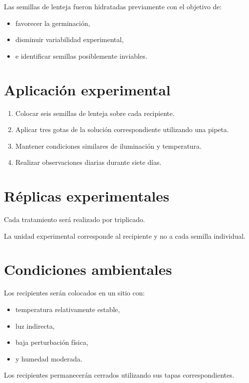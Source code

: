 Las semillas de lenteja fueron hidratadas previamente con el objetivo de:

\begin{itemize}
\item favorecer la germinación,
\item disminuir variabilidad experimental,
\item e identificar semillas posiblemente inviables.
\end{itemize}

\section{Aplicación experimental}

\begin{enumerate}
\item Colocar seis semillas de lenteja sobre cada recipiente.
\item Aplicar tres gotas de la solución correspondiente utilizando una pipeta.
\item Mantener condiciones similares de iluminación y temperatura.
\item Realizar observaciones diarias durante siete días.
\end{enumerate}

\section{Réplicas experimentales}

Cada tratamiento será realizado por triplicado.

La unidad experimental corresponde al recipiente y no a cada semilla individual.

\section{Condiciones ambientales}

Los recipientes serán colocados en un sitio con:

\begin{itemize}
\item temperatura relativamente estable,
\item luz indirecta,
\item baja perturbación física,
\item y humedad moderada.
\end{itemize}

Los recipientes permanecerán cerrados utilizando sus tapas correspondientes.

